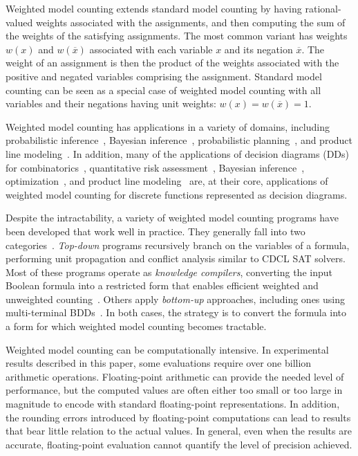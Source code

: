 \documentclass[letterpaper,USenglish,cleveref, autoref, thm-restate]{lipics-v2021}
\newcommand{\obar}[1]{\overline{#1}}
\begin{document}
Weighted model counting extends standard model counting by having
rational-valued weights associated with the assignments, and then
computing the sum of the weights of the satisfying assignments.  The
most common variant has weights $w(x)$ and $w(\obar{x})$
associated with each variable $x$ and its negation $\obar{x}$.  The
weight of an assignment is then the product of the weights associated
with the positive and negated variables comprising the assignment.
Standard model counting can be seen as a special case of weighted model
counting with all variables and their negations having unit weights: $w(x) = w(\obar{x}) = 1$.

Weighted model counting has applications in a variety of domains,
including probabilistic inference~\cite{chavira:ai:2008,dubray:cp:2024}, Bayesian
inference~\cite{sang:aaai:2005}, probabilistic
planning~\cite{domshlak:jair:2007}, and product line modeling~\cite{sundermann:eme:2023,sundermann:tsem:2024}.  In addition, many of the
applications of decision diagrams (DDs) for
combinatorics~\cite{knuth:bdd:2011}, quantitative risk
assessment~\cite{andrews:ieeetr:2000,groen:ress:2006,xing:wiley:2015,xing:amm:2025},
Bayesian inference~\cite{minato:ijcai:2007},
optimization~\cite{bergman:book:2016}, and
product line modeling~\cite{andersen:jair:2010,benavides:is:2010} are, at their core, applications of
weighted model counting for discrete functions represented as decision diagrams.

Despite the intractability, a variety of weighted model counting
programs have been developed that work well in practice.  They
generally fall into two categories~\cite{shaw:kr:2024}. \emph{Top-down} programs
recursively branch on the variables of a formula, performing unit
propagation and conflict analysis similar to CDCL SAT solvers.  Most
of these programs operate as \emph{knowledge compilers}, converting
the input Boolean formula into a restricted form that enables efficient
weighted and unweighted counting~\cite{darwiche:aaai:2002,darwiche:ecai:2004,lagniez:ijcai:2017,muise:cai:2012,oztok:cp:2014,sharma:ijcai:2019}.
Others apply \emph{bottom-up} approaches, including ones using
multi-terminal BDDs~\cite{dudek:aaai:2020,dudek:sat:2021}.  In both
cases, the strategy is to convert the formula into a form for which
weighted model counting becomes tractable.

Weighted model counting can be computationally intensive.  In
experimental results described in this paper, some evaluations 
require over one billion arithmetic operations.
Floating-point arithmetic can provide the needed level of performance,
but the computed values are often either too small or too
large in magnitude to encode with standard floating-point
representations.  In addition, the rounding errors
introduced by floating-point computations can lead to results
that bear little relation to the actual values.  In general, even when the results are accurate,
floating-point evaluation cannot quantify the level of precision achieved.
\end{document}
